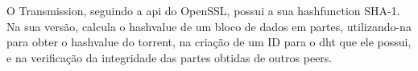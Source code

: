 O Transmission, seguindo a \gls{api} do OpenSSL, possui a sua \gls*{hashfunction}
SHA-1. Na sua versão, calcula o \gls*{hashvalue} de um bloco de dados em partes,
utilizando-na para obter o \gls*{hashvalue} do \gls*{torrent}, na criação de um ID para
o \gls*{dht} que ele possui, e na verificação da integridade das partes obtidas de
outros \glspl*{peer}.


